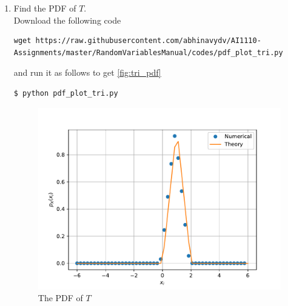 \documentclass[journal,12pt,twocolumn]{IEEEtran}
\renewcommand\thesection{\arabic{section}}
\begin{document}
\begin{enumerate}[label=\thesection.\arabic*
        ,ref=\thesection.\theenumi]
    \item Find the PDF of $T$.\\
          \solution  Download the following code
          \begin{lstlisting}
wget https://raw.githubusercontent.com/abhinavydv/AI1110-Assignments/master/RandomVariablesManual/codes/pdf_plot_tri.py
\end{lstlisting}
          and run it as follows to get \autoref{fig:tri_pdf}
          \begin{lstlisting}
$ python pdf_plot_tri.py
\end{lstlisting}
          \begin{figure}
              \centering
              \includegraphics[width=\columnwidth]{./figs/tri_pdf}
              \caption{The PDF of $T$}
              \label{fig:tri_pdf}
          \end{figure}


\end{enumerate}
\end{document}

